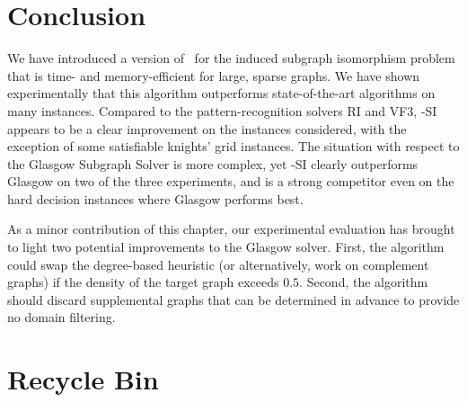 \section{Conclusion}\label{sec:mcsplit-si-conclusion}

We have introduced a version of \McSplit\ for the induced subgraph isomorphism problem that is time- and memory-efficient for large, sparse graphs.
We have shown experimentally that this algorithm outperforms state-of-the-art algorithms on many instances.
Compared to the pattern-recognition solvers RI and VF3, \McSplit-SI appears to be a clear improvement
on the instances considered, with the exception of some satisfiable knights' grid instances.  The situation
with respect to the Glasgow Subgraph Solver is more complex, yet \McSplit-SI clearly outperforms Glasgow on
two of the three experiments, and is a strong competitor even on the hard decision instances
where Glasgow performs best.

As a minor contribution of this chapter, our experimental evaluation has
brought to light two potential improvements to the Glasgow solver.  First, the
algorithm could swap the degree-based heuristic (or alternatively, work on
complement graphs) if the density of the target graph exceeds $0.5$.  Second,
the algorithm should discard supplemental graphs that can be determined in
advance to provide no domain filtering.

\section{Recycle Bin}

